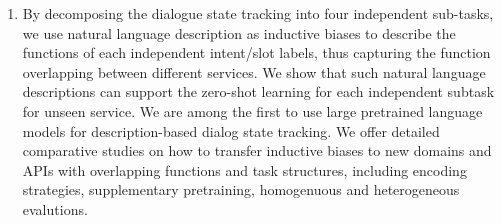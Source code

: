 \begin{enumerate}
\item By decomposing the dialogue state tracking into four independent
  sub-tasks, we use natural language description as inductive biases
  to describe the functions of each independent intent/slot labels,
  thus capturing the function overlapping between different
  services. We show that such natural language descriptions can
  support the zero-shot learning for each independent subtask for
  unseen service. We are among the first to use large pretrained
  language models for description-based dialog state tracking. We
  offer detailed comparative studies on how to transfer inductive
  biases to new domains and APIs with overlapping functions and task
  structures, including encoding strategies, supplementary
  pretraining, homogenuous and heterogeneous evalutions.
\end{enumerate}


